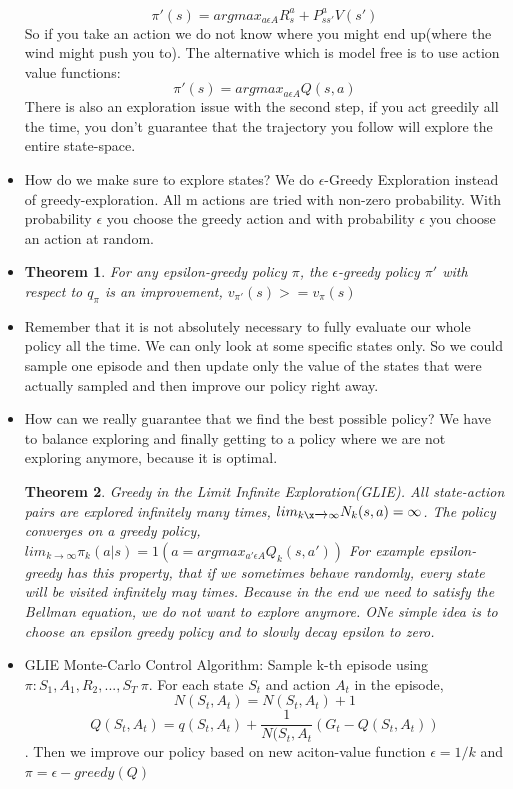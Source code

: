 \documentclass[a4paper]{article}
\newtheorem{theorem}{Theorem}
\begin{document}
\begin{itemize}
$$\pi'(s) = argmax_{a \epsilon A} R_s^a + P_{ss'}^aV(s')$$ So if you take an action we do not know where you might end up(where the wind might push you to). The alternative which is model free is to use action value functions:
$$\pi'(s) = argmax_{a\epsilon A} Q(s,a)$$
There is also an exploration issue with the second step, if you act greedily all the time, you don't guarantee that the trajectory you follow will explore the entire state-space.
\item How do we make sure to explore states? We do $\epsilon$-Greedy Exploration instead of greedy-exploration. All m actions are tried with non-zero probability. With probability $\epsilon$ you choose the greedy action and with probability $\epsilon$ you choose an action at random. 
\item
\begin{theorem}
For any epsilon-greedy policy $\pi$, the $\epsilon$-greedy policy $\pi'$ with respect to $q_{\pi}$ is an improvement, $v_{\pi'}(s) >= v_{\pi}(s)$
\end{theorem}
\item Remember that it is not absolutely necessary to fully evaluate our whole policy all the time. We can only look at some specific states only. So we could sample one episode and then update only the value of the states that were actually sampled and then improve our policy right away. 
\item How can we really guarantee that we find the best possible policy? We have to balance exploring and finally getting to a policy where we are not exploring anymore, because it is optimal. 
\begin{theorem}
Greedy in the Limit Infinite Exploration(GLIE). All state-action pairs are explored infinitely many times, $lim_{k\x \xrightarrow{} \infty} N_k(s,a) = \infty$. The policy converges on a greedy policy, $lim_{k \xrightarrow{} \infty} \pi_k(a|s) = 1(a=argmax_{a' \epsilon A} Q_k(s,a'))$
For example epsilon-greedy has this property, that if we sometimes behave randomly, every state will be visited infinitely may times. Because in the end we need to satisfy the Bellman equation, we do not want to explore anymore. ONe simple idea is to choose an epsilon greedy policy and to slowly decay epsilon to zero. 
\end{theorem}
\item GLIE Monte-Carlo Control Algorithm: Sample k-th episode using $\pi: {S_1, A_1, R_2, ..., S_T} ~ \pi$. For each state $S_t$ and action $A_t$ in the episode, $$ N(S_t, A_t) = N(S_t, A_t) + 1$$ $$ Q(S_t, A_t)= q(S_t, A_t) + \frac{1}{N(S_t,A_t}(G_t - Q(S_t, A_t))$$. Then we improve our policy based on new aciton-value function $\epsilon = 1/k$ and $\pi = \epsilon-greedy(Q)$

\end{itemize}
\end{document}
